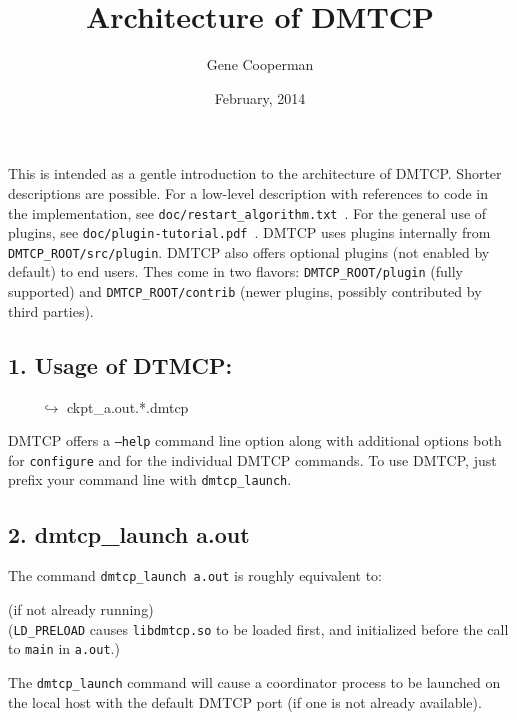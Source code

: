 \documentclass{article}
\title{Architecture of DMTCP}
\author{Gene Cooperman}
\date{February, 2014}
\begin{document}
\maketitle

This is intended as a gentle introduction to the architecture of DMTCP.
Shorter descriptions are possible.  For a low-level description with
references to code in the implementation, see
{\tt doc/restart\_algorithm.txt}~.  For the general use of plugins,
see {\tt doc/plugin-tutorial.pdf}~.  DMTCP uses plugins internally
from {\tt DMTCP\_ROOT/src/plugin}.  DMTCP also offers optional plugins
(not enabled by default) to end users.  Thes come in two flavors:
{\tt DMTCP\_ROOT/plugin}
(fully supported) and {\tt DMTCP\_ROOT/contrib} (newer plugins,
possibly contributed by third parties).

\subsection*{1. Usage of DTMCP:}
\begin{algorithmic}[1]
 \newline
\hbox{\ \ \ \ } $\hookrightarrow$ ckpt\_a.out.*.dmtcp
\end{algorithmic}

\bigskip
\noindent
DMTCP offers a {\tt --help} command line option along with additional options
both for {\tt configure} and for the individual DMTCP commands.
To use DMTCP, just prefix your command line with {\tt dmtcp\_launch}.

\subsection*{2. dmtcp\_launch a.out}

The command {\tt dmtcp\_launch a.out} is roughly equivalent to:

\begin{algorithmic}[1]
  (if not already running)
 \\ ({\tt LD\_PRELOAD} causes
   {\tt libdmtcp.so} to be loaded first, and initialized before the call to
   {\tt main} in {\tt a.out}.)
\end{algorithmic}

The {\tt dmtcp\_launch} command will cause a coordinator process
to be launched on the local host with the default DMTCP port (if one is
not already available).
\end{document}
